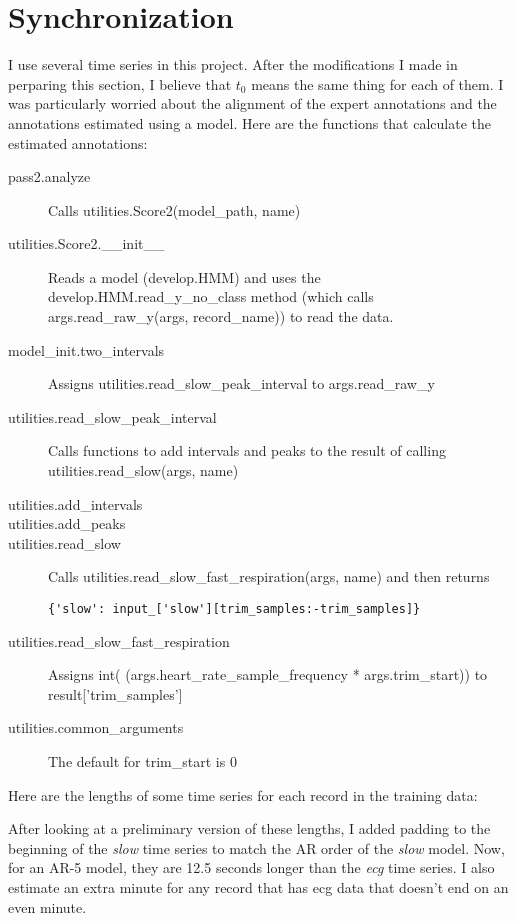 \documentclass[12pt]{article}
\begin{document}
\section{Synchronization}
\label{sec:sync}

I use several time series in this project.  After the modifications I
made in perparing this section, I believe that $t_0$ means the same
thing for each of them.  I was particularly worried about the alignment
of the expert annotations and the annotations estimated using a model.
Here are the functions that calculate the estimated annotations:
\begin{description}
\item[pass2.analyze] Calls utilities.Score2(model\_path, name)
\item[utilities.Score2.\_\_init\_\_] Reads a model (develop.HMM) and
  uses the develop.HMM.read\_y\_no\_class method (which calls
  args.read\_raw\_y(args, record\_name)) to read the data.
\item[model\_init.two\_intervals] Assigns
  utilities.read\_slow\_peak\_interval to args.read\_raw\_y
\item[utilities.read\_slow\_peak\_interval] Calls functions to add
  intervals and peaks to the result of calling
  utilities.read\_slow(args, name)
\item[utilities.add\_intervals] 
\item[utilities.add\_peaks]
\item[utilities.read\_slow] Calls
  utilities.read\_slow\_fast\_respiration(args, name) and then returns
\begin{verbatim}
{'slow': input_['slow'][trim_samples:-trim_samples]}
\end{verbatim}
\item[utilities.read\_slow\_fast\_respiration] Assigns int(
  (args.heart\_rate\_sample\_frequency * args.trim\_start)) to
  result['trim\_samples']
\item[utilities.common\_arguments] The default for trim\_start is 0
\end{description}

Here are the lengths of some time series for each record in the
training data:



After looking at a preliminary version of these lengths, I added
padding to the beginning of the \emph{slow} time series to match the
AR order of the \emph{slow} model.  Now, for an AR-5 model, they are
12.5 seconds longer than the \emph{ecg} time series.  I also estimate
an extra minute for any record that has ecg data that doesn't end on
an even minute.
\end{document}
